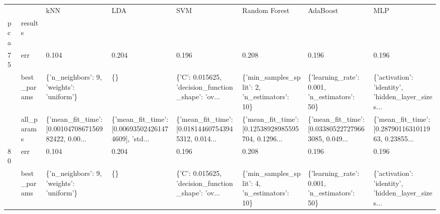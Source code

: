\begin{tabular}{llllllll}
\toprule
    &            &                                                kNN &                                                LDA &                                                SVM &                                      Random Forest &                                           AdaBoost &                                                MLP \\
pca & results &                                                    &                                                    &                                                    &                                                    &                                                    &                                                    \\
\midrule
75  & err &                                              0.104 &                                              0.204 &                                              0.196 &                                              0.208 &                                              0.196 &                                              0.196 \\
    & best\_params &           \{'n\_neighbors': 9, 'weights': 'uniform'\} &                                                 \{\} &  \{'C': 0.015625, 'decision\_function\_shape': 'ov... &       \{'min\_samples\_split': 2, 'n\_estimators': 10\} &       \{'learning\_rate': 0.001, 'n\_estimators': 50\} &  \{'activation': 'identity', 'hidden\_layer\_sizes... \\
    & all\_params &  \{'mean\_fit\_time': [0.0010470867156982422, 0.00... &  \{'mean\_fit\_time': [0.006935024261474609], 'std... &  \{'mean\_fit\_time': [0.018144607543945312, 0.014... &  \{'mean\_fit\_time': [0.12538928985595704, 0.1296... &  \{'mean\_fit\_time': [0.033805227279663085, 0.049... &  \{'mean\_fit\_time': [0.2879011631011963, 0.23855... \\
80  & err &                                              0.104 &                                              0.204 &                                              0.196 &                                              0.208 &                                              0.196 &                                              0.196 \\
    & best\_params &           \{'n\_neighbors': 9, 'weights': 'uniform'\} &                                                 \{\} &  \{'C': 0.015625, 'decision\_function\_shape': 'ov... &       \{'min\_samples\_split': 4, 'n\_estimators': 10\} &       \{'learning\_rate': 0.001, 'n\_estimators': 50\} &  \{'activation': 'identity', 'hidden\_layer\_sizes... \\

\end{tabular}
